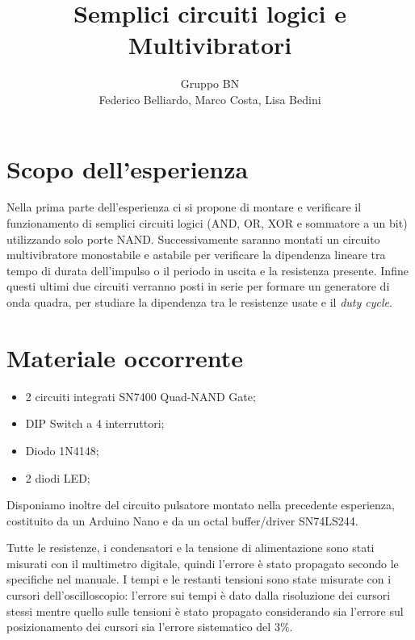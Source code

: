 \documentclass[10pt,a4paper]{article}
\author{Gruppo BN \\ Federico Belliardo, Marco Costa, Lisa Bedini}
\title{Semplici circuiti logici e Multivibratori}
\begin{document}
\maketitle
\section{Scopo dell'esperienza}
Nella prima parte dell'esperienza ci si propone di montare e verificare il funzionamento di semplici circuiti logici (AND, OR, XOR e sommatore a un bit) utilizzando solo porte NAND. Successivamente saranno montati un circuito multivibratore monostabile e astabile per verificare la dipendenza lineare tra tempo di durata dell'impulso o il periodo in uscita e la resistenza presente. Infine questi ultimi due circuiti verranno posti in serie per formare un generatore di onda quadra, per studiare la dipendenza tra le resistenze usate e il \emph{duty cycle}.\\

\section{Materiale occorrente}
\begin{itemize}
\item 2 circuiti integrati SN7400 Quad-NAND Gate;
\item DIP Switch a 4 interruttori;
\item Diodo 1N4148;
\item 2 diodi LED;
\end{itemize}
Disponiamo inoltre del circuito pulsatore montato nella precedente esperienza, costituito da un Arduino Nano e da un octal buffer/driver SN74LS244.

Tutte le resistenze, i condensatori e la tensione di alimentazione sono stati misurati con il multimetro digitale, quindi l'errore è stato propagato secondo le specifiche nel manuale. I tempi e le restanti tensioni sono state misurate con i cursori dell'oscilloscopio: l'errore sui tempi è dato dalla risoluzione dei cursori stessi mentre quello sulle tensioni è stato propagato considerando sia l'errore sul posizionamento dei cursori sia l'errore sistematico del $3\%$.
\end{document}

